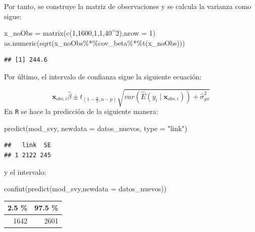 \documentclass[
  12pt,
]{book}
\newenvironment{Shaded}{\begin{snugshade}}{\end{snugshade}}
\newcommand{\AttributeTok}[1]{\textcolor[rgb]{0.77,0.63,0.00}{#1}}
\newcommand{\DecValTok}[1]{\textcolor[rgb]{0.00,0.00,0.81}{#1}}
\newcommand{\FunctionTok}[1]{\textcolor[rgb]{0.00,0.00,0.00}{#1}}
\newcommand{\NormalTok}[1]{#1}
\newcommand{\OtherTok}[1]{\textcolor[rgb]{0.56,0.35,0.01}{#1}}
\newcommand{\SpecialCharTok}[1]{\textcolor[rgb]{0.00,0.00,0.00}{#1}}
\newcommand{\StringTok}[1]{\textcolor[rgb]{0.31,0.60,0.02}{#1}}
\begin{document}
Por tanto, se construye la matriz de observaciones y se calcula la varianza como sigue:

\begin{Shaded}
\begin{Highlighting}[]
\NormalTok{x\_noObs }\OtherTok{=} \FunctionTok{matrix}\NormalTok{(}\FunctionTok{c}\NormalTok{(}\DecValTok{1}\NormalTok{,}\DecValTok{1600}\NormalTok{,}\DecValTok{1}\NormalTok{,}\DecValTok{1}\NormalTok{,}\DecValTok{40}\SpecialCharTok{\^{}}\DecValTok{2}\NormalTok{),}\AttributeTok{nrow =} \DecValTok{1}\NormalTok{)}
\FunctionTok{as.numeric}\NormalTok{(}\FunctionTok{sqrt}\NormalTok{(x\_noObs}\SpecialCharTok{\%*\%}\NormalTok{cov\_beta}\SpecialCharTok{\%*\%}\FunctionTok{t}\NormalTok{(x\_noObs)))}
\end{Highlighting}
\end{Shaded}

\begin{verbatim}
## [1] 244.6
\end{verbatim}

Por último, el intervalo de confianza sigue la siguiente ecuación:

\[
\boldsymbol{x}_{obs,i}\hat{\beta}\pm t_{\left(1-\frac{\alpha}{2},n-p\right)}\sqrt{var\left(\hat{E}\left(y_{i}\mid\boldsymbol{x}_{obs,i}\right)\right)+\hat{\sigma}_{yx}^{2}}
\]
En \texttt{R} se hace la predicción de la siguiente manera:

\begin{Shaded}
\begin{Highlighting}[]
\FunctionTok{predict}\NormalTok{(mod\_svy, }\AttributeTok{newdata =}\NormalTok{ datos\_nuevos, }\AttributeTok{type =}  \StringTok{"link"}\NormalTok{)}
\end{Highlighting}
\end{Shaded}

\begin{verbatim}
##   link  SE
## 1 2122 245
\end{verbatim}

y el intervalo:

\begin{Shaded}
\begin{Highlighting}[]
\FunctionTok{confint}\NormalTok{(}\FunctionTok{predict}\NormalTok{(mod\_svy,}\AttributeTok{newdata =}\NormalTok{ datos\_nuevos))}
\end{Highlighting}
\end{Shaded}

\begin{tabular}{r|r}
\hline
2.5 \% & 97.5 \%\\
\hline
1642 & 2601\\
\hline
\end{tabular}
\end{document}

